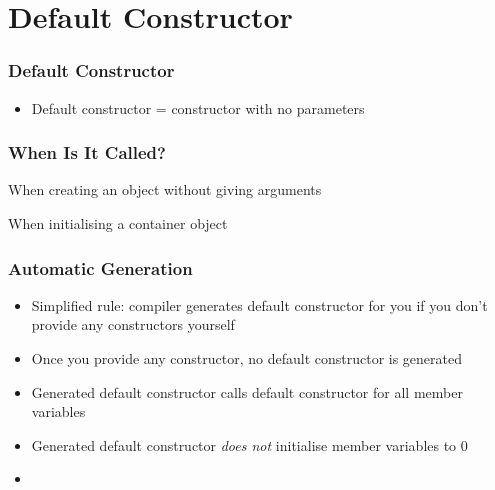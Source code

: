 \section{Default Constructor}

\frame{\tableofcontents[currentsection]}


\begin{frame}
  \frametitle{Default Constructor}
  \begin{itemize}
    \item Default constructor = constructor with no parameters
  \end{itemize}
\end{frame}

\begin{frame}
  \frametitle{When Is It Called?}
  \begin{overprint}
  \end{overprint}
  \vskip5mm
  \begin{overprint}
    \begin{center}
      When creating an object without giving arguments
    \end{center}
    \begin{center}
      When initialising a container object
    \end{center}
  \end{overprint}
\end{frame}

\begin{frame}
  \frametitle{Automatic Generation}
  \begin{itemize}
    \item Simplified rule: compiler generates default constructor for you if
          you don't provide any constructors yourself
    \item Once you provide any constructor, no default
          constructor is generated
    \item Generated default constructor calls default
          constructor for all member variables
    \item Generated default constructor \emph{does not}
          initialise member variables to 0
    \item {}
  \end{itemize}
\end{frame}

